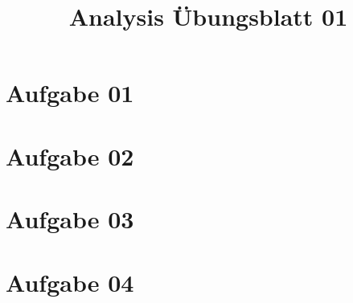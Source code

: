 \documentclass[a4paper,11pt]{article}
\title{Analysis Übungsblatt 01}
\begin{document}
\maketitle

\section{Aufgabe 01}
\section{Aufgabe 02}
\section{Aufgabe 03}
\section{Aufgabe 04}
\end{document}

